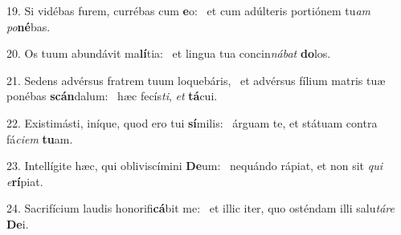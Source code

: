 19. Si vidébas furem, currébas cum \textbf{e}o: \ast\  et cum adúlteris portiónem tu\textit{am} \textit{po}\textbf{né}bas.\

20. Os tuum abundávit ma\textbf{lí}tia: \ast\  et lingua tua concin\textit{ná}\textit{bat} \textbf{do}los.\

21. Sedens advérsus fratrem tuum loquebáris, \dag\  et advérsus fílium matris tuæ ponébas \textbf{scán}dalum: \ast\  hæc fecís\textit{ti}, \textit{et} \textbf{tá}cui.\

22. Existimásti, iníque, quod ero tui \textbf{sí}milis: \ast\  árguam te, et státuam contra fá\textit{ci}\textit{em} \textbf{tu}am.\

23. Intellígite hæc, qui obliviscímini \textbf{De}um: \ast\  nequándo rápiat, et non sit \textit{qui} \textit{e}\textbf{rí}piat.\

24. Sacrifícium laudis honorifi\textbf{cá}bit me: \ast\  et illic iter, quo osténdam illi salu\textit{tá}\textit{re} \textbf{De}i.\

